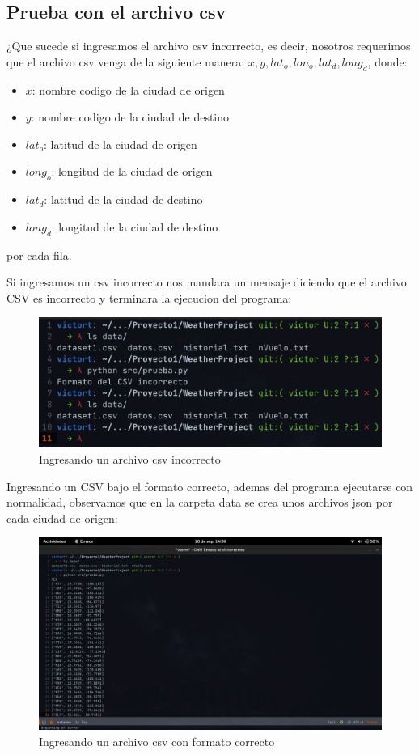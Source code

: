 \documentclass[12pt]{article}
\begin{document}
\subsection{Prueba con el archivo csv}
¿Que sucede si ingresamos el archivo csv incorrecto, es decir, nosotros requerimos que el archivo csv venga de la siguiente manera: $x,y,lat_o,lon_o,lat_d, long_d$, donde:
\begin{itemize}
\item $x$: nombre codigo de la ciudad de origen
\item $y$: nombre codigo de la ciudad de destino
\item $lat_o$: latitud de la ciudad de origen
\item $long_o$: longitud de la ciudad de origen
\item $lat_d$: latitud de la ciudad de destino
\item $long_d$: longitud de la ciudad de destino
\end{itemize}
por cada fila.

Si ingresamos un csv incorrecto nos mandara un mensaje diciendo que el archivo CSV es incorrecto y terminara la ejecucion del programa:\\
\begin{figure}[ht]
  \centering
  \includegraphics[scale=0.5]{figures/csvmalo}
  \caption{Ingresando un archivo csv incorrecto}
\end{figure}
\newpage
Ingresando un CSV bajo el formato correcto, ademas del programa ejecutarse con normalidad, observamos que en la carpeta data se crea unos archivos json por cada ciudad de origen:
\begin{figure}[ht]
  \centering
  \includegraphics[scale=0.2]{figures/csv1}
  \caption{Ingresando un archivo csv con formato correcto}
\end{figure}
\end{document}
